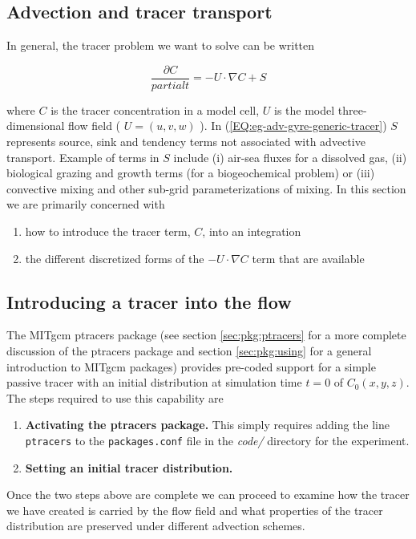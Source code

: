\subsection{Advection and tracer transport}

In general, the tracer problem we want to solve can be written

\begin{equation}
\label{EQ:eg-adv-gyre-generic-tracer}
\frac{\partial C}{partial t} = -U \cdot \nabla C + S
\end{equation}

where $C$ is the tracer concentration in a model cell, $U$ is the model three-dimensional
flow field ( $U=(u,v,w)$ ). In (\ref{EQ:eg-adv-gyre-generic-tracer}) $S$ represents source, sink 
and tendency terms not associated with advective transport. Example of terms in $S$ include
(i) air-sea fluxes for a dissolved gas, (ii) biological grazing and growth terms (for a 
biogeochemical problem) or (iii) convective mixing and other sub-grid parameterizations of 
mixing. In this section we are primarily concerned with 
\begin{enumerate}
\item how to introduce the tracer term, $C$, into an integration
\item the different discretized forms of 
the $-U \cdot \nabla C$ term that are available
\end{enumerate}


\subsection{Introducing a tracer into the flow}

 The MITgcm ptracers package (see section \ref{sec:pkg:ptracers} for a more complete discussion
of the ptracers package and section \ref{sec:pkg:using} for a general introduction to MITgcm 
packages) provides pre-coded support for a simple passive tracer with an initial
distribution at simulation time $t=0$ of $C_0(x,y,z)$. The steps required to use this capability
are 
\begin{enumerate}
\item{\bf Activating the ptracers package.} This simply requires adding the line {\tt ptracers} to
the {\tt packages.conf} file in the {\it code/} directory for the experiment. 
\item{\bf Setting an initial tracer distribution.} 
\end{enumerate}

Once the two steps above are complete we can proceed to examine how the tracer we have created is
carried by the flow field and what properties of the tracer distribution are preserved under
different advection schemes.

